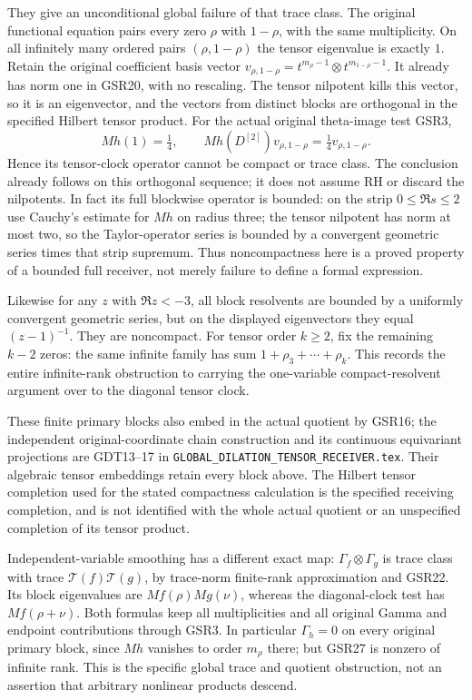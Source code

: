 They give an unconditional
global failure of that trace
class. The original functional
equation pairs every zero
$\rho$ with $1-\rho$, with
the same multiplicity.
On all infinitely many
ordered pairs $(\rho,1-\rho)$
the tensor eigenvalue is
exactly $1$. Retain the
original coefficient basis
vector
$v_{\rho,1-\rho}
=t^{m_\rho-1}\otimes t^{m_{1-\rho}-1}$.
It already has norm one
in GSR20, with no rescaling.
The tensor nilpotent kills
this vector, so it is an
eigenvector, and the vectors
from distinct blocks are
orthogonal in the specified
Hilbert tensor product.
For the actual original
theta-image test GSR3,
\begin{equation}\tag{GSR27}
 Mh(1)=\tfrac14,\qquad
 Mh(D^{[2]})v_{\rho,1-\rho}
                         =\tfrac14v_{\rho,1-\rho}.
\end{equation}
Hence its tensor-clock
operator cannot be compact
or trace class. The conclusion
already follows on this
orthogonal sequence; it
does not assume RH or
discard the nilpotents.
In fact its full blockwise
operator is bounded: on
the strip $0\le\Re s\le2$
use Cauchy's estimate for
$Mh$ on radius three;
the tensor nilpotent has
norm at most two, so the
Taylor-operator series is
bounded by a convergent
geometric series times
that strip supremum.
Thus noncompactness here
is a proved property of
a bounded full receiver,
not merely failure to
define a formal expression.

Likewise for any $z$ with
$\Re z<-3$, all block
resolvents are bounded
by a uniformly convergent
geometric series, but on
the displayed eigenvectors
they equal $(z-1)^{-1}$.
They are noncompact.
For tensor order $k\ge2$,
fix the remaining $k-2$
zeros: the same infinite
family has sum
$1+\rho_3+\cdots+\rho_k$.
This records the entire
infinite-rank obstruction
to carrying the one-variable
compact-resolvent argument
over to the diagonal tensor
clock.

These finite primary blocks
also embed in the actual
quotient by GSR16; the
independent original-coordinate
chain construction and its
continuous equivariant
projections are GDT13--17
in \nolinkurl{GLOBAL_DILATION_TENSOR_RECEIVER.tex}.
Their algebraic tensor
embeddings retain every
block above. The Hilbert
tensor completion used
for the stated compactness
calculation is the specified
receiving completion, and
is not identified with
the whole actual quotient
or an unspecified completion
of its tensor product.

Independent-variable
smoothing has a different
exact map:
$\Gamma_f\otimes\Gamma_g$
is trace class with trace
$\mathcal T(f)\mathcal T(g)$,
by trace-norm finite-rank
approximation and GSR22.
Its block eigenvalues are
$Mf(\rho)Mg(\nu)$, whereas
the diagonal-clock test
has $Mf(\rho+\nu)$.
Both formulas keep all
multiplicities and all
original Gamma and endpoint
contributions through GSR3.
In particular $\Gamma_h=0$
on every original primary
block, since $Mh$ vanishes
to order $m_\rho$ there;
but GSR27 is nonzero of
infinite rank. This is the
specific global trace and
quotient obstruction, not
an assertion that arbitrary
nonlinear products descend.


